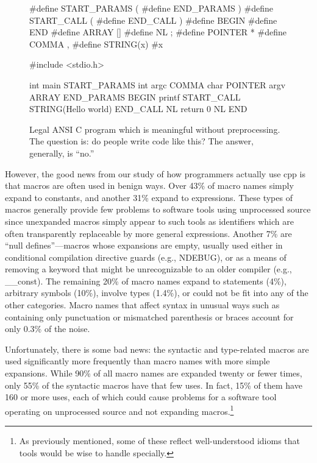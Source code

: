 \documentclass{article}
\newcommand{\Cpp}{\mbox{\textsf{cpp}}}
\newcommand{\C}{\mbox{\textsf{C}}}
\newcommand{\eg}{e.g.,}
\begin{document}
\begin{figure}[hbt]
\begin{center}
\begin{small}
\begin{pseudocode}[5.5in]
#define START_PARAMS (
#define END_PARAMS )
#define START_CALL (
#define END_CALL )
#define BEGIN {
#define END }
#define ARRAY []
#define NL ;
#define POINTER *
#define COMMA ,
#define STRING(x) #x

#include <stdio.h>

int main START_PARAMS int argc COMMA char POINTER argv ARRAY END_PARAMS BEGIN
  printf START_CALL STRING(Hello world\n) END_CALL NL
  return 0 NL
END
\end{pseudocode}
\end{small}
\caption{Legal ANSI \C{} program which is meaningful without
  preprocessing.  The question is: do people write code like this?  The
  answer, generally, is ``no.''}
\label{fig:worstcase}
\end{center}
\end{figure}

However, the good news from our study of how programmers actually use
\Cpp{} is that macros are often used in benign ways.  Over 43\% of macro
names simply expand to constants, and another 31\% expand to
expressions.  These types of macros generally provide few problems to
software tools using unprocessed source since unexpanded macros simply
appear to such tools as identifiers which are often transparently
replaceable by more general expressions.  Another 7\% are ``null
defines''---macros whose expansions are empty, usually used either in
conditional compilation directive guards (\eg{} NDEBUG), or as a means
of removing a keyword that might be unrecognizable to an older compiler
(\eg{} \_\_const).  The remaining 20\% of macro names expand to statements
(4\%), arbitrary symbols (10\%), involve types (1.4\%), or could not be
fit into any of the other categories.  Macro names that affect syntax in
unusual ways such as containing only punctuation or mismatched
parenthesis or braces account for only 0.3\% of the noise.

Unfortunately, there is some bad news: the syntactic and type-related
macros are used significantly more frequently than macro names with more
simple expansions.  While 90\% of all macro names are expanded twenty or
fewer times, only 55\% of the syntactic macros have that few uses.  In
fact, 15\% of them have 160 or more uses, each of which could cause
problems for a software tool operating on unprocessed source and not
expanding macros.\footnote{As previously mentioned, some of these reflect
  well-understood idioms that tools would be wise to handle specially.}
\end{document}
